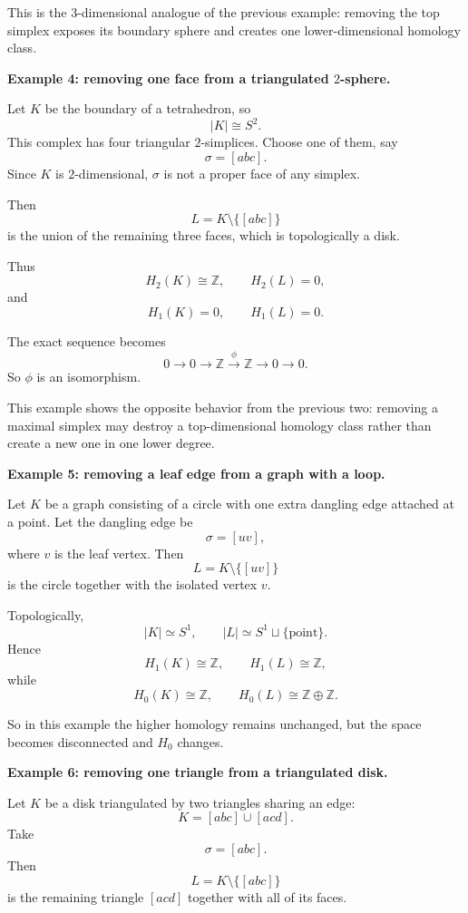 \documentclass[12pt,a4paper]{article}
\theoremstyle{notespace}
\begin{document}
This is the \(3\)-dimensional analogue of the previous example: removing the top simplex exposes its boundary sphere and creates one lower-dimensional homology class.

\medskip

\textbf{Example 4: removing one face from a triangulated \(2\)-sphere.}

Let \(K\) be the boundary of a tetrahedron, so
\[
|K|\cong S^2.
\]
This complex has four triangular \(2\)-simplices. Choose one of them, say
\[
\sigma=[abc].
\]
Since \(K\) is \(2\)-dimensional, \(\sigma\) is not a proper face of any simplex.

Then
\[
L=K\setminus\{[abc]\}
\]
is the union of the remaining three faces, which is topologically a disk.

Thus
\[
H_2(K)\cong \mathbb Z,\qquad H_2(L)=0,
\]
and
\[
H_1(K)=0,\qquad H_1(L)=0.
\]

The exact sequence becomes
\[
0\to 0\to \mathbb Z
\xrightarrow{\phi}
\mathbb Z
\to 0\to 0.
\]
So \(\phi\) is an isomorphism.

This example shows the opposite behavior from the previous two: removing a maximal simplex may destroy a top-dimensional homology class rather than create a new one in one lower degree.

\medskip

\textbf{Example 5: removing a leaf edge from a graph with a loop.}

Let \(K\) be a graph consisting of a circle with one extra dangling edge attached at a point. Let the dangling edge be
\[
\sigma=[uv],
\]
where \(v\) is the leaf vertex. Then
\[
L=K\setminus\{[uv]\}
\]
is the circle together with the isolated vertex \(v\).

Topologically,
\[
|K|\simeq S^1,
\qquad
|L|\simeq S^1\sqcup \{\text{point}\}.
\]
Hence
\[
H_1(K)\cong \mathbb Z,\qquad H_1(L)\cong \mathbb Z,
\]
while
\[
H_0(K)\cong \mathbb Z,\qquad H_0(L)\cong \mathbb Z\oplus \mathbb Z.
\]

So in this example the higher homology remains unchanged, but the space becomes disconnected and \(H_0\) changes.

\medskip

\textbf{Example 6: removing one triangle from a triangulated disk.}

Let \(K\) be a disk triangulated by two triangles sharing an edge:
\[
K=[abc]\cup[acd].
\]
Take
\[
\sigma=[abc].
\]
Then
\[
L=K\setminus\{[abc]\}
\]
is the remaining triangle \([acd]\) together with all of its faces.
\end{document}
